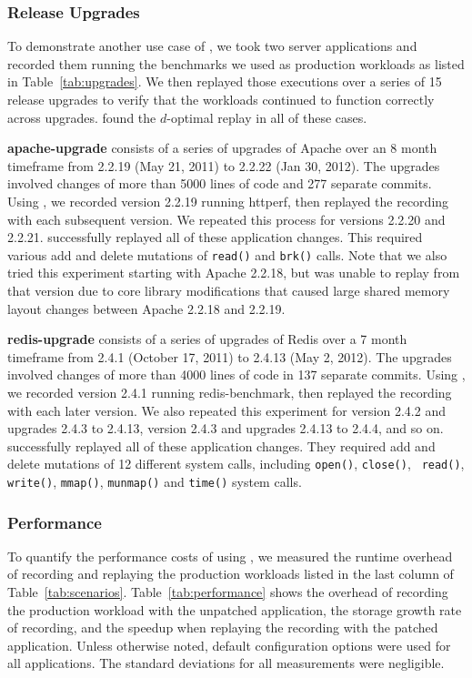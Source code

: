 \subsubsection{Release Upgrades}
\label{sec:upgrades}

To demonstrate another use case of {\dora}, we took two server applications
and recorded them running the benchmarks we used as production
workloads as listed in Table~\ref{tab:upgrades}. We then replayed
those executions over a series of 15 release upgrades to verify that
the workloads continued to function correctly across upgrades. {\dora} found
the $d$-optimal replay in all of these cases.

{\bf apache-upgrade} consists of a series of upgrades of Apache over
an 8 month timeframe from 2.2.19 (May 21, 2011) to 2.2.22 (Jan 30,
2012). The upgrades involved changes of more than 5000 lines of code 
and 277 separate commits. Using {\dora}, we recorded version
2.2.19 running httperf, then replayed the recording with each subsequent
version. We repeated this process for versions 2.2.20 and 2.2.21.
{\dora} successfully replayed all of these
application changes. This required various add and delete mutations of
{\tt read()} and {\tt brk()} calls.  Note that we also tried
this experiment starting with Apache 2.2.18, but {\dora} was unable
to replay from that version due to core library modifications
that caused large shared memory layout changes between Apache 2.2.18
and 2.2.19.

{\bf redis-upgrade} consists of a series of upgrades of Redis over a
7 month timeframe from 2.4.1 (October 17, 2011) to 2.4.13 (May 2,
2012).  The upgrades involved changes of more than 4000 lines of code
in 137 separate commits.  Using {\dora}, we recorded version 2.4.1
running redis-benchmark, then replayed the recording with each later
version. We also repeated this experiment for version 2.4.2 and
upgrades 2.4.3 to 2.4.13, version 2.4.3 and upgrades 2.4.13 to 2.4.4, and so on.
{\dora} successfully replayed all of these
application changes. They required add and delete mutations of
12 different system calls, including {\tt open()}, {\tt close()}, {\tt
read()}, {\tt write()}, {\tt mmap()}, {\tt munmap()} and {\tt time()}
system calls.

\subsubsection{Performance}
\label{sec:performance}

To quantify the performance costs of using {\dora}, we measured the
runtime overhead of recording and replaying the production workloads 
listed in the last column of Table~\ref{tab:scenarios}.
Table~\ref{tab:performance} shows the overhead of recording the
production workload with the unpatched application,
the storage growth rate of recording, and the
speedup when replaying the recording with the patched application.
Unless otherwise noted, default configuration options were used for
all applications.  The standard deviations for all measurements were
negligible.

